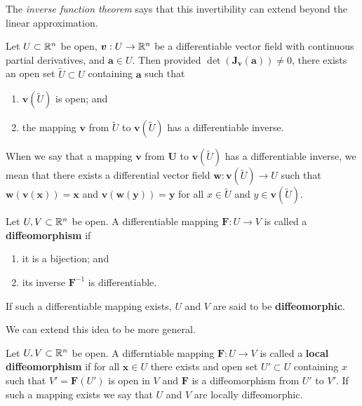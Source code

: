 
The \emph{inverse function theorem} says that this invertibility can extend
beyond the linear approximation.

\begin{theorem}
    Let $U \subset \mathbb{R}^n$ be open, $\bm v: U \to \mathbb{R}^n$ be a differentiable
    vector field with continuous partial derivatives, and $\bm a \in U$.
    Then provided $\det(\bm J_{\bm v}(\bm a)) \neq 0$, there exists an open set
    $\tilde U \subset U$ containing $\bm a$ such that
    \begin{enumerate}
        \item $\bm v(\tilde U)$ is open; and
        \item the mapping $\bm v$ from $\tilde U$ to $\bm v(\tilde U)$ has a
            differentiable inverse.
    \end{enumerate}
\end{theorem}

When we say that a mapping $\bm v$ from $\bm U$ to $\bm v(\tilde U)$ has a
differentiable inverse, 
we mean that there exists a differential vector field 
$\bm w: \bm v(\tilde U) \to U$ 
such that 
$\bm w(\bm v(\bm x)) = \bm x$
and 
$\bm v(\bm w(\bm y)) = \bm y$ 
for all 
$x \in \tilde U$ and $y \in \bm v(\tilde U)$.

\begin{definition}[Diffeomorphism]
    Let $U, V \subset \mathbb{R}^n$ be open.
    A differentiable mapping $\bm F: U \to V$ is called a \textbf{diffeomorphism}
    if
    \begin{enumerate}
        \item it is a bijection; and
        \item its inverse $\bm F^{-1}$ is differentiable.
    \end{enumerate}
    If such a differentiable mapping exists, $U$ and $V$ are said to be \textbf{diffeomorphic}.
\end{definition}

We can extend this idea to be more general.

\begin{definition}
    Let $U, V \subset \mathbb{R}^n$ be open.
    A differntiable mapping $\bm F: U \to V$ is called a \textbf{local diffeomorphism}
    if for all $\bm x \in U$ there exists and open set $U' \subset U$ containing $x$ such that
    $V' = \bm F(U')$ is open in $V$ and $\bm F$ is a diffeomorphism from $U'$ to $V'$.
    If such a mapping exists we say that $U$ and $V$ are locally diffeomorphic.
\end{definition}

